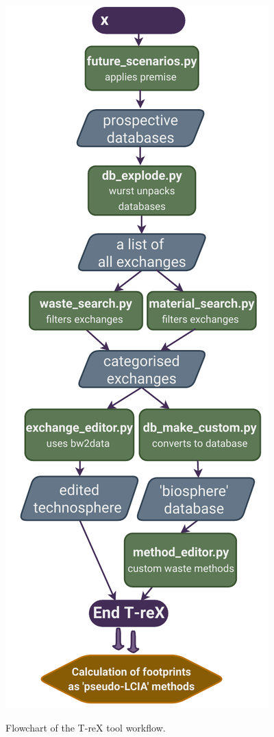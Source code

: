 \begin{figure}[ht]
    \centering
    \caption{Flowchart of the T-reX tool workflow.}
    \includegraphics[width=\textwidth]{figures/T-reX_workflow.pdf}
    \label{fig:methods-flowchart}
\end{figure}


